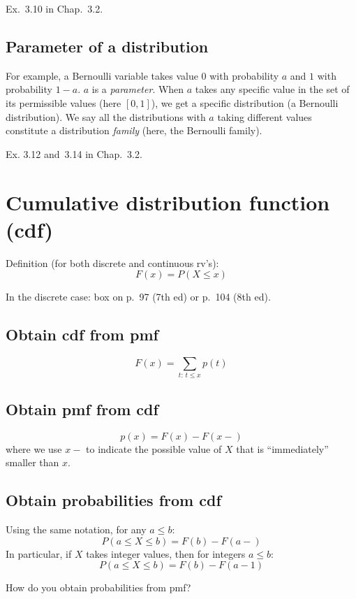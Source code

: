 \documentclass[12pt]{article}
\begin{document}
\example
Ex.~3.10 in Chap.~3.2.


\subsection{Parameter of a distribution}

For example,
a Bernoulli variable takes value $0$ with probability $a$
and $1$ with probability $1 - a$.
$a$ is a \emph{parameter}.
When $a$ takes any specific value in the set of its permissible values
(here $[0, 1]$), we get a specific distribution (a Bernoulli
distribution).
We say all the distributions with $a$ taking different values
constitute a distribution \emph{family} (here, the Bernoulli family).

\example
Ex. 3.12 and~3.14 in Chap.~3.2.




\section{Cumulative distribution function (cdf)}

Definition (for both discrete and continuous rv's):
\[
F(x) = P(X \le x)
\]

In the discrete case:
box on p.~97 (7th ed) or p.~104 (8th ed).

\subsection{Obtain cdf from pmf}

\[
F(x) = \sum_{t:\, t\le x} p(t)
\]

\subsection{Obtain pmf from cdf}

\[
p(x) = F(x) - F(x-)
\]
where we use $x-$ to indicate the possible value of $X$
that is ``immediately'' smaller than $x$.

\subsection{Obtain probabilities from cdf}

Using the same notation,
for any $a \le b$:
\[ P(a \le X \le b) = F(b) - F(a-) \]
In particular,
if $X$ takes integer values, then for integers $a \le b$:
\[ P(a \le X \le b) = F(b) - F(a - 1) \]

\exercise How do you obtain probabilities from pmf?
\end{document}
